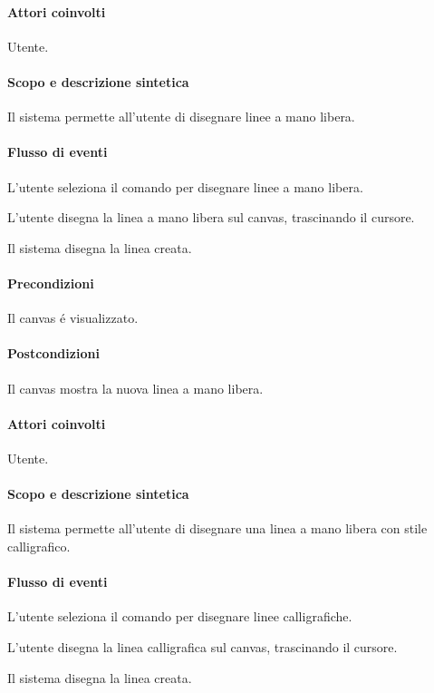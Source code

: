 \paragraph{Attori coinvolti} Utente.
\paragraph{Scopo e descrizione sintetica} 
Il sistema permette all'utente di disegnare linee a mano libera.
\paragraph{Flusso di eventi}
\begin{elenconumerato}[\textbf{}]{\subsubsecindent}
\item L'utente seleziona il comando per disegnare linee a mano libera.
\item L'utente disegna la linea a mano libera sul canvas, trascinando il cursore.
\item Il sistema disegna la linea creata.
\end{elenconumerato}
\paragraph{Precondizioni} Il canvas \'e visualizzato.
\paragraph{Postcondizioni} Il canvas mostra la nuova linea a mano libera.

\paragraph{Attori coinvolti} Utente.
\paragraph{Scopo e descrizione sintetica} 
Il sistema permette all'utente di disegnare una linea a mano libera con stile calligrafico.
\paragraph{Flusso di eventi}
\begin{elenconumerato}[\textbf{}]{\subsubsecindent}
\item L'utente seleziona il comando per disegnare linee calligrafiche.
\item L'utente disegna la linea calligrafica sul canvas, trascinando il cursore.
\item Il sistema disegna la linea creata.
\end{elenconumerato}
